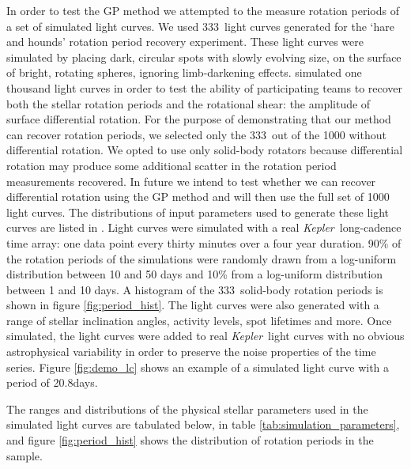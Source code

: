 \documentclass[useAMS, usenatbib, preprint, 12pt]{aastex}
\newcommand{\Kepler}{{\it Kepler}}
\newcommand{\kepler}{\Kepler}
\newcommand{\naigrain}{333}
\newcommand{\aigrainexampleperiod}{20.8}
\begin{document}
In order to test the GP method we attempted to the measure rotation periods of
a set of simulated light curves.
We used \naigrain\ light curves generated for the \citet{Aigrain2015}
`hare and hounds' rotation period recovery experiment.
These light curves were simulated by placing dark, circular spots with slowly
evolving size, on the surface of bright, rotating spheres, ignoring
limb-darkening effects.
\citet{Aigrain2015} simulated one thousand light curves in order to test the
ability of participating teams to recover both the stellar rotation periods
and the rotational shear: the amplitude of surface differential rotation.
For the purpose of demonstrating that our method can recover rotation periods,
we selected only the \naigrain\ out of the 1000 without differential
rotation.
We opted to use only solid-body rotators because differential rotation may
produce some additional scatter in the rotation period measurements recovered.
In future we intend to test whether we can recover differential rotation using
the GP method and will then use the full set of 1000 light curves.
The distributions of input parameters used to generate these light curves are
listed in \citet{Aigrain2015}.
Light curves were simulated with a real \Kepler\ long-cadence time array:
one data point every thirty minutes over a four year duration.
90\% of the rotation periods of the simulations were randomly drawn from a
log-uniform distribution between 10 and 50 days and 10\% from a log-uniform
distribution between 1 and 10 days.
A histogram of the \naigrain\ solid-body rotation periods is shown in figure
\ref{fig:period_hist}.
The light curves were also generated with a range of stellar inclination
angles, activity levels, spot lifetimes and more.
Once simulated, the light curves were added to real \kepler\ light curves with
no obvious astrophysical variability in order to preserve the noise properties
of the time series.
Figure \ref{fig:demo_lc} shows an example of a simulated light curve with a
period of \aigrainexampleperiod days.

The ranges and distributions of the physical stellar parameters used in the
simulated light curves are tabulated below, in table
\ref{tab:simulation_parameters}, and figure \ref{fig:period_hist} shows the
distribution of rotation periods in the \citet{Aigrain2015} sample.
\end{document}
